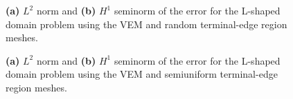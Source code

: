 \documentclass[pdflatex,sn-mathphys]{sn-jnl}%
\theoremstyle{thmstyleone}%
\theoremstyle{thmstyletwo}%
\theoremstyle{thmstylethree}%
\begin{document}
\begin{figure}[!bth]
\centering     %
{} \hspace{0.5cm}
\caption{\textbf{(a)} $L^2$ norm and \textbf{(b)} $H^1$ seminorm of the error for the L-shaped domain problem using the VEM and random terminal-edge region meshes.}
\label{figs:NormsLshapedRandom} 
\end{figure}

\begin{figure}[!bth]
\centering     %
{} \hspace{0.5cm}
\caption{\textbf{(a)} $L^2$ norm and \textbf{(b)} $H^1$ seminorm of the error for the L-shaped domain problem using the VEM and semiuniform terminal-edge region meshes.}
\label{figs:NormsLshapedSemiuniform} 
\end{figure}
\end{document}
